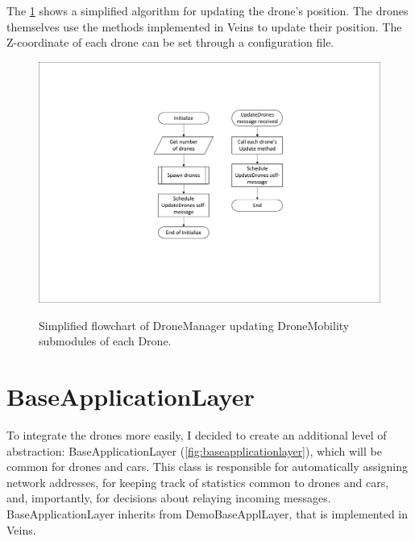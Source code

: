\documentclass[]{nsm-thesis}
\begin{document}
The \cref{fig:dronemanagerflow} shows a simplified algorithm for updating the drone's position. The drones themselves use the methods implemented in Veins to update their position. The Z-coordinate of each drone can be set through a configuration file.

\begin{figure}
  	\caption{Simplified flowchart of DroneManager updating DroneMobility submodules of each Drone.}
	\centering
	\includegraphics[width=1\textwidth]{figures/DroneManager.pdf}
	\label{fig:dronemanagerflow}
\end{figure}


\section{BaseApplicationLayer}

To integrate the drones more easily, I decided to create an additional level of abstraction: BaseApplicationLayer (\cref{fig:baseapplicationlayer}), which will be common for drones and cars. This class is responsible for automatically assigning network addresses, for keeping track of statistics common to drones and cars, and, importantly, for decisions about relaying incoming messages. BaseApplicationLayer inherits from DemoBaseApplLayer, that is implemented in Veins.
\end{document}
